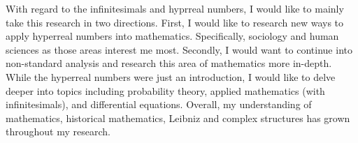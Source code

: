 \documentclass[12pt]{report}
\begin{document}
With regard to the infinitesimals and hyprreal numbers, I would like to mainly take this research in two directions.
First, I would like to research new ways to apply hyperreal numbers into mathematics.
Specifically, sociology and human sciences as those areas interest me most.
Secondly, I would want to continue into non-standard analysis and research this area of mathematics more in-depth.
While the hyperreal numbers were just an introduction, I would like to delve deeper into topics including probability theory, applied mathematics (with infinitesimals), and differential equations.
Overall, my understanding of mathematics, historical mathematics, Leibniz and complex structures has grown throughout my research.
\newpage
    
\end{document}
